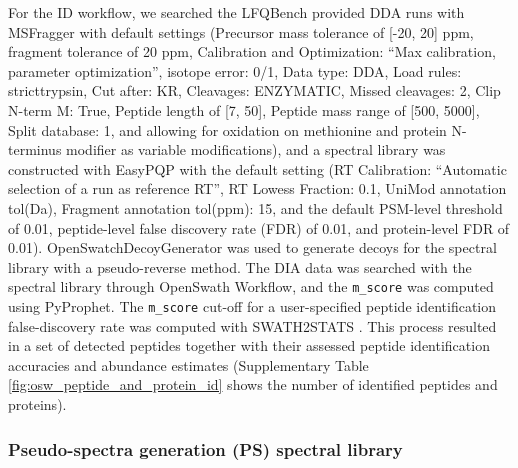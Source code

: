 \documentclass[10pt,letterpaper]{article}
\begin{document}
For the ID workflow, we searched the LFQBench provided DDA runs with MSFragger\cite{kong2017msfragger} with default settings (Precursor mass tolerance of [-20, 20] ppm, fragment tolerance of 20 ppm, Calibration and Optimization: ``Max calibration, parameter optimization'', isotope error: 0/1, Data type: DDA, Load rules: stricttrypsin, Cut after: KR, Cleavages: ENZYMATIC, Missed cleavages: 2, Clip N-term M: True, Peptide length of [7, 50], Peptide mass range of [500, 5000], Split database: 1, and allowing for oxidation on methionine and protein N-terminus modifier as variable modifications), and a spectral library was constructed with EasyPQP \cite{easypqp} with the default setting (RT Calibration: ``Automatic selection of a run as reference RT'', RT Lowess Fraction: 0.1, UniMod annotation tol(Da), Fragment annotation tol(ppm): 15, and the default PSM-level threshold of 0.01, peptide-level false discovery rate (FDR) of 0.01, and protein-level FDR of 0.01). OpenSwatchDecoyGenerator was used to generate decoys for the spectral library with a pseudo-reverse method. The DIA data was searched with the spectral library through OpenSwath Workflow, and the \texttt{m\_score} was computed using PyProphet\cite{teleman2015diana}. The \texttt{m\_score} cut-off for a user-specified peptide identification false-discovery rate was computed with SWATH2STATS \cite{blattmann2016swath2stats}. This process resulted in a set of detected peptides together with their assessed peptide identification accuracies and abundance estimates (Supplementary Table \ref{fig:osw_peptide_and_protein_id} shows the number of identified peptides and proteins).


\subsubsection*{Pseudo-spectra generation (PS) spectral library}
\end{document}
